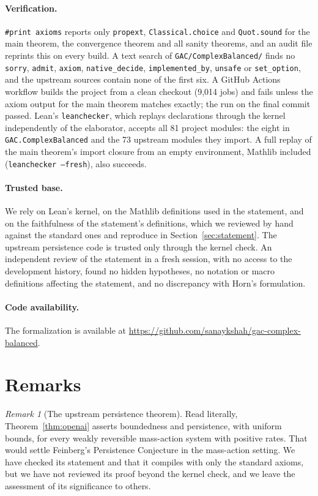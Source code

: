 \documentclass[11pt]{article}
\newcommand{\lean}[1]{\texttt{#1}}
\theoremstyle{plain}
\theoremstyle{definition}
\theoremstyle{remark}
\newtheorem{remark}[theorem]{Remark}
\begin{document}
\paragraph{Verification.} \lean{\#print axioms} reports only \lean{propext}, \lean{Classical.choice} and \lean{Quot.sound} for the main theorem, the convergence theorem and all sanity theorems, and an audit file reprints this on every build. A text search of \lean{GAC/ComplexBalanced/} finds no \lean{sorry}, \lean{admit}, \lean{axiom}, \lean{native\_decide}, \lean{implemented\_by}, \lean{unsafe} or \lean{set\_option}, and the upstream sources contain none of the first six. A GitHub Actions workflow builds the project from a clean checkout (9,014 jobs) and fails unless the axiom output for the main theorem matches exactly; the run on the final commit passed. Lean's \lean{leanchecker}, which replays declarations through the kernel independently of the elaborator, accepts all 81 project modules: the eight in \lean{GAC.ComplexBalanced} and the 73 upstream modules they import. A full replay of the main theorem's import closure from an empty environment, Mathlib included (\lean{leanchecker --fresh}), also succeeds.

\paragraph{Trusted base.} We rely on Lean's kernel, on the Mathlib definitions used in the statement, and on the faithfulness of the statement's definitions, which we reviewed by hand against the standard ones and reproduce in Section~\ref{sec:statement}. The upstream persistence code is trusted only through the kernel check. An independent review of the statement in a fresh session, with no access to the development history, found no hidden hypotheses, no notation or macro definitions affecting the statement, and no discrepancy with Horn's formulation.

\paragraph{Code availability.} The formalization is available at \url{https://github.com/sanaykshah/gac-complex-balanced}.

\section{Remarks}\label{sec:remarks}

\begin{remark}[The upstream persistence theorem]
Read literally, Theorem~\ref{thm:openai} asserts boundedness and persistence, with uniform bounds, for every weakly reversible mass-action system with positive rates. That would settle Feinberg's Persistence Conjecture in the mass-action setting. We have checked its statement and that it compiles with only the standard axioms, but we have not reviewed its proof beyond the kernel check, and we leave the assessment of its significance to others.
\end{remark}
\end{document}
